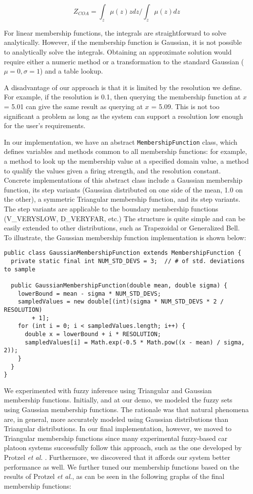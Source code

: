 \documentclass[12pt,letterpaper,oneside]{report}
\newcommand \etal{\textit{et al.}}
\begin{document}
$$Z_{COA} = \int_z \mu(z)zdz / \int_z \mu(z)dz$$

For linear membership functions, the integrals are straightforward to solve
analytically. However, if the membership function is Gaussian, it is not
possible to analytically solve the integrals. Obtaining an approximate solution
would require either a numeric method or a transformation to the standard
Gaussian ($\mu = 0, \sigma = 1$) and a table lookup.

A disadvantage of our approach is that it is limited by the resolution we
define. For example, if the resolution is 0.1, then querying the membership
function at $x$ = 5.01 can give the same result as querying at $x$ = 5.09. This
is not too significant a problem as long as the system can support a resolution
low enough for the user's requirements.

In our implementation, we have an abstract \texttt{MembershipFunction} class,
which defines variables and methods common to all membership functions: for
example, a method to look up the membership value at a specified domain value,
a method to qualify the values given a firing strength, and the resolution
constant.  Concrete implementations of this abstract class include a Gaussian
membership function, its step variants (Gaussian distributed on one side of the
mean, 1.0 on the other), a symmetric Triangular membership function, and its
step variants. The step variants are applicable to the boundary membership
functions (\textsc{V\_VERYSLOW}, \textsc{D\_VERYFAR}, etc.) The structure is
quite simple and can be easily extended to other distributions, such as
Trapezoidal or Generalized Bell. To illustrate, the Gaussian membership
function implementation is shown below:

\footnotesize
\begin{verbatim}
public class GaussianMembershipFunction extends MembershipFunction {
  private static final int NUM_STD_DEVS = 3;  // # of std. deviations to sample
	
  public GaussianMembershipFunction(double mean, double sigma) {
    lowerBound = mean - sigma * NUM_STD_DEVS;
    sampledValues = new double[(int)(sigma * NUM_STD_DEVS * 2 / RESOLUTION) 
        + 1];
    for (int i = 0; i < sampledValues.length; i++) {
      double x = lowerBound + i * RESOLUTION;
      sampledValues[i] = Math.exp(-0.5 * Math.pow((x - mean) / sigma, 2));
    }
  }
}
\end{verbatim}
\normalsize

We experimented with fuzzy inference using Triangular and Gaussian membership
functions. Initially, and at our demo, we modeled the fuzzy sets using Gaussian
membership functions. The rationale was that natural phenomena are, in general,
more accurately modeled using Gaussian distributions than Triangular
distributions. In our final implementation, however, we moved to Triangular
membership functions since many experimental fuzzy-based car platoon systems
successfully follow this approach, such as the one developed by Protzel \etal
\cite{protzel-fuzzy}. Furthermore, we discovered that it affords our system better
performance as well. We further tuned our membership functions based on the
results of Protzel \etal, as can be seen in the following graphs of the final
membership functions:
\end{document}
